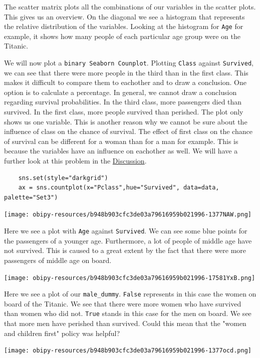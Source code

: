 \documentclass[11pt]{article}
\begin{document}
The scatter matrix plots all the combinations of our variables in the scatter plots. This gives us an overview. On the diagonal we see a histogram that represents the relative distribution of the variables. Looking at the histogram for \texttt{Age} for example, it shows how many people of each particular age group were on the Titanic. 


We will now plot a \texttt{binary Seaborn Counplot}. Plotting \texttt{Class} against \texttt{Survived}, we can see that there were more people in the third than in the first class. This makes it difficult to compare them to eachother and to draw a conclusion. One option is to calculate a percentage. In general, we cannot draw a conclusion regarding survival probabilities. In the third class, more passengers died than survived. In the first class, more people survived than perished. The plot only shows us one variable. This is another reason why we cannot be sure about the influence of class on the chance of survival. The effect of first class on the chance of survival can be different for a woman than for a man for example. This is because the variables have an influence on eachother as well. We will have a further look at this problem in the \hyperref[sec:discussion]{Discussion}.

\begin{verbatim}
    sns.set(style="darkgrid")
    ax = sns.countplot(x="Pclass",hue="Survived", data=data, palette="Set3")
\end{verbatim}

\begin{center}
\texttt{[image: obipy-resources/b948b903cfc3de03a79616959b021996-1377NAW.png]}
\end{center}

Here we see a plot with \texttt{Age} against \texttt{Survived}. We can see some blue points for the passengers of a younger age. Furthermore, a lot of people of middle age have not survived. This is caused to a great extent by the fact that there were more passengers of middle age on board.




\begin{center}
\texttt{[image: obipy-resources/b948b903cfc3de03a79616959b021996-17581YxB.png]}
\end{center}

Here we see a plot of our \texttt{male\_dummy}. \texttt{False} represents in this case the women on board of the Titanic. We see that there were more women who have survived than women who did not. \texttt{True} stands in this case for the men on board. We see that more men have perished than survived. Could this mean that the "women and children first" policy was helpful? 
\begin{center}
\texttt{[image: obipy-resources/b948b903cfc3de03a79616959b021996-1377ocd.png]}
\end{center}
\end{document}

